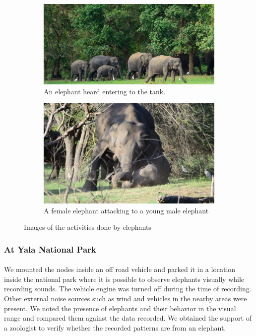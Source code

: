 \documentclass[12pt]{article}
\numberwithin{figure}{section}
\numberwithin{table}{section}
\begin{document}
\begin{figure}[H]
\centering
\begin{subfigure}{.5\textwidth}
  \centering
  \includegraphics[width=.8\linewidth]{Kalawewa4.jpg}
  \caption{An elephant heard entering to the tank.}
  \label{fig:sub1}
\end{subfigure}%
\begin{subfigure}{.5\textwidth}
  \centering
  \includegraphics[width=.8\linewidth]{Kalawewa5.jpg}
  \caption{A female elephant attacking to a young male elephant}
  \label{fig:sub2}
\end{subfigure}
\caption{Images of the activities done by elephants}
\label{fig:test}
\end{figure} 
 
 
\subsubsection{At Yala National Park} 
\paragraph{}
We mounted the nodes inside an off road vehicle and parked it in a location inside the national park where it is possible to observe elephants visually while recording sounds. The vehicle engine was turned off during the time of recording. Other external noise sources such as wind and vehicles in the nearby areas were present. We noted the presence of elephants and their behavior in the visual range and compared them against the data recorded. We obtained the support of a zoologist to verify whether the recorded patterns are from an elephant.
\end{document}
